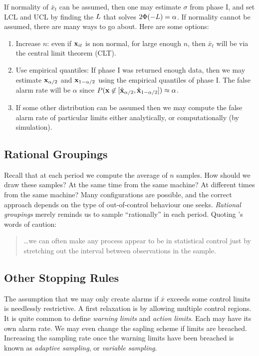 If normality of $\bar{x}_t$ can be assumed, then one may estimate $\sigma$ from phase I, and set LCL and UCL by finding the $L$ that solves $2\Phi(-L)=\alpha$.
If normality cannot be assumed, there are many ways to go about. Here are some options:
\begin{enumerate}
\item Increase $n$: even if $\mathbf{x}_{it}$ is non normal, for large enough $n$, then $\bar{x}_t$ will be via the central limit theorem (CLT).
\item Use empirical quantiles: If phase I was returned enough data, then we may estimate $\mathbf{x}_{\alpha/2}$ and $\mathbf{x}_{1-\alpha/2}$ using the empirical quantiles of phase I. The false alarm rate will be $\alpha$ since $P(\mathbf{x} \not \in [\hat{\mathbf{x}}_{\alpha/2},\hat{\mathbf{x}}_{1-\alpha/2}]) \approx \alpha$.
\item If some other distribution can be assumed then we may compute the false alarm rate of particular limits either analytically, or computationally (by simulation).
\end{enumerate}




\subsection{Rational Groupings}
\label{sec:rational_grouping}
Recall that at each period we compute the average of $n$ samples. 
How should we draw these samples? 
At the same time from the same machine?
At different times from the same machine?
Many configurations are possible, and the correct approach depends on the type of out-of-control behaviour one seeks. 
\emph{Rational groupings} merely reminds us to sample ``rationally'' in each period. 
Quoting \cite{montgomery_introduction_2007}'s words of caution:
\begin{quotation}
\dots we can often make any process appear to be in statistical control just by stretching out the interval between observations in the sample.
\end{quotation}






\subsection{Other Stopping Rules}
\label{sec:stopping_rules}

The assumption that we may only create alarms if $\bar{x}$ exceeds some control limits is needlessly restrictive.
A first relaxation is by allowing multiple control regions.
It is quite common to define \emph{warning limits} and \emph{action limits}. Each may have its own alarm rate.
We may even change the sapling scheme if limits are breached. Increasing the sampling rate once the warning limits have been breached is known as \emph{adaptive sampling}, or \emph{variable sampling}.



